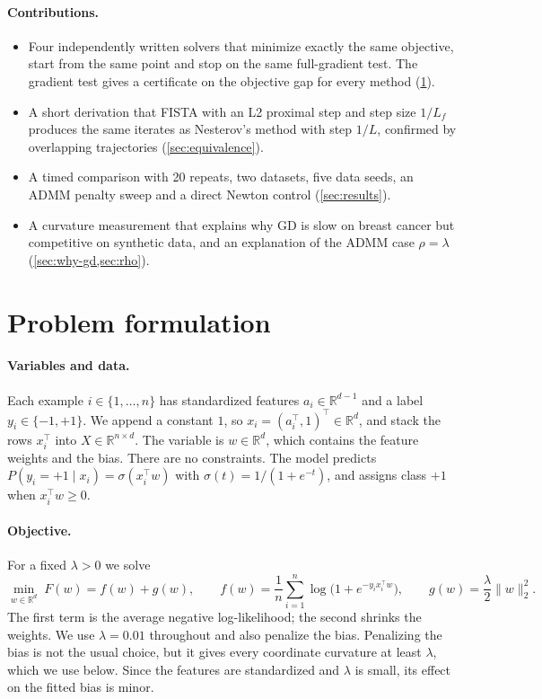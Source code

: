\documentclass{article}
\newcommand{\R}{\mathbb{R}}
\begin{document}
\paragraph{Contributions.}
\begin{itemize}
  \item Four independently written solvers that minimize exactly the same objective, start from the same point and stop on the same full-gradient test. The gradient test gives a certificate on the objective gap for every method (\cref{sec:formulation}).
  \item A short derivation that FISTA with an L2 proximal step and step size $1/L_f$ produces the same iterates as Nesterov's method with step $1/L$, confirmed by overlapping trajectories (\cref{sec:equivalence}).
  \item A timed comparison with 20 repeats, two datasets, five data seeds, an ADMM penalty sweep and a direct Newton control (\cref{sec:results}).
  \item A curvature measurement that explains why GD is slow on breast cancer but competitive on synthetic data, and an explanation of the ADMM case $\rho=\lambda$ (\cref{sec:why-gd,sec:rho}).
\end{itemize}

\section{Problem formulation}
\label{sec:formulation}

\paragraph{Variables and data.}
Each example $i\in\{1,\dots,n\}$ has standardized features $a_i\in\R^{d-1}$ and a label $y_i\in\{-1,+1\}$. We append a constant $1$, so $x_i=(a_i^\top,1)^\top\in\R^d$, and stack the rows $x_i^\top$ into $X\in\R^{n\times d}$. The variable is $w\in\R^d$, which contains the feature weights and the bias. There are no constraints. The model predicts $P(y_i=+1\mid x_i)=\sigma(x_i^\top w)$ with $\sigma(t)=1/(1+e^{-t})$, and assigns class $+1$ when $x_i^\top w\ge 0$.

\paragraph{Objective.}
For a fixed $\lambda>0$ we solve
\begin{equation}
\label{eq:objective}
\min_{w\in\R^d}\; F(w)=f(w)+g(w),\qquad
f(w)=\frac1n\sum_{i=1}^n\log\!\bigl(1+e^{-y_i x_i^\top w}\bigr),\qquad
g(w)=\frac{\lambda}{2}\|w\|_2^2 .
\end{equation}
The first term is the average negative log-likelihood; the second shrinks the weights. We use $\lambda=0.01$ throughout and also penalize the bias. Penalizing the bias is not the usual choice, but it gives every coordinate curvature at least $\lambda$, which we use below. Since the features are standardized and $\lambda$ is small, its effect on the fitted bias is minor.
\end{document}
